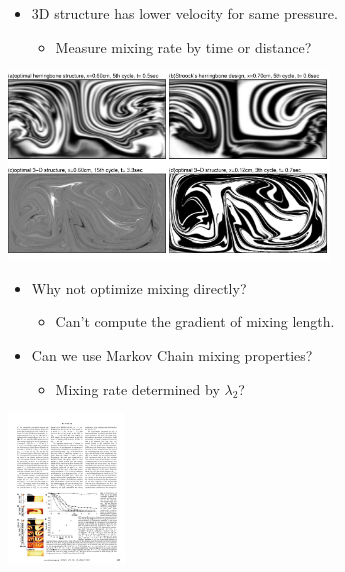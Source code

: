 \documentclass[12pt,t]{beamer}
\begin{document}
\begin{frame}
  \begin{itemize}
  \item 3D structure has lower velocity for same pressure.
    \begin{itemize}
    \item Measure mixing rate by time or distance?
    \end{itemize}
  \end{itemize}
  \begin{center}
    \includegraphics[height=5cm]{example2crosscompare}
  \end{center}
\end{frame}
\begin{frame}
  \begin{itemize}
  \item Why not optimize mixing directly?
    \begin{itemize}
    \item Can't compute the gradient of mixing length.
    \end{itemize}
  \item Can we use Markov Chain mixing properties?
    \begin{itemize}
    \item Mixing rate determined by $\lambda_2$?
    \end{itemize}
  \end{itemize}
  \begin{center}
    \includegraphics[height=4cm,trim=6.5cm 8.8cm 5cm 14cm,clip=true]{stroock_page3}
  \end{center}
\end{frame}
\end{document}
